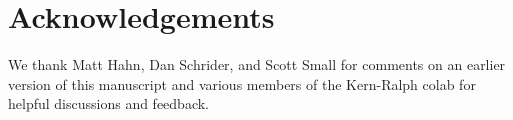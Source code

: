 \section*{Acknowledgements}
We thank Matt Hahn, Dan Schrider, and Scott Small for comments on an earlier version of this manuscript
and various members of the Kern-Ralph colab for helpful discussions and feedback.


